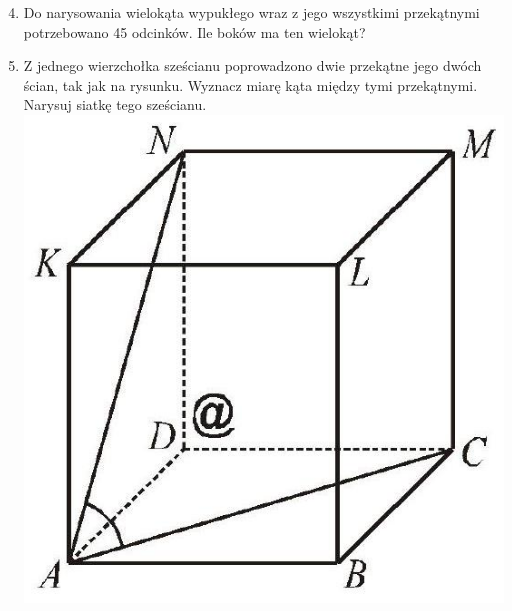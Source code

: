 \documentclass[10pt]{article}
\begin{document}
\begin{enumerate}
  \setcounter{enumi}{3}
  \item Do narysowania wielokąta wypukłego wraz z jego wszystkimi przekątnymi potrzebowano 45 odcinków. Ile boków ma ten wielokąt?
  \item Z jednego wierzchołka sześcianu poprowadzono dwie przekątne jego dwóch ścian, tak jak na rysunku. Wyznacz miarę kąta między tymi przekątnymi. Narysuj siatkę tego sześcianu.\\
\includegraphics[max width=\textwidth, center]{2024_11_21_ddff019caeba361186e5g-1}
\end{enumerate}
\end{document}
